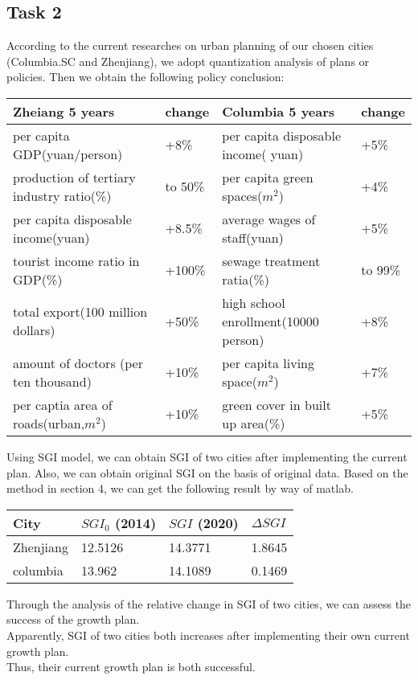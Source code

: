 \documentclass{mcmthesis}
\begin{document}
\subsection{Task 2}%
According to the current researches on urban planning of our chosen cities (Columbia.SC and Zhenjiang), we adopt quantization analysis of plans or policies. Then we obtain the following policy conclusion:\\
\begin{table}[h]

\centering
{}
\begin{tabular}{p{5.2cm}|p{1.2cm}|p{5.2cm}|p{1.2cm}}
\hline
\bf Zheiang 5 years	 & \bf change	 & \bf Columbia 5 years	& \bf change \\
\hline
 per capita GDP(yuan/person)	& +8\%	& per capita disposable income( yuan)	& +5\% \\
production of tertiary industry ratio(\%)	& to 50\%	& per capita green spaces($m^2$)	& +4\% \\
per capita disposable income(yuan)	& +8.5\%	& average wages of staff(yuan)	& +5\% \\
tourist income ratio in GDP(\%)	& +100\%	& sewage treatment ratia(\%)	& to 99\% \\
total export(100 million dollars)	& +50\%	& high school enrollment(10000 person)	& +8\% \\
amount of doctors (per ten thousand)	& +10\%	& per capita living space($m^2$)	& +7\% \\
per captia area of roads(urban,$m^2$)	& +10\%	& green cover in built up area(\%)	& +5\% \\
\hline
\end{tabular}
\end{table}

\noindent Using SGI model, we can obtain SGI of two cities after implementing the current plan. Also, we can obtain original SGI on the basis of original data. Based on the method in section 4, we can get the following result by way of matlab.\\

\begin{table}[h]
\setlength{\abovecaptionskip}{0pt}
\setlength{\belowcaptionskip}{0pt}
\begin{tabular}{p{3.3cm}|p{3cm}|p{3cm}|p{3.3cm}}
\hline
City	& $SGI_0$ (2014)	& $SGI$ (2020)	& $\Delta SGI$ \\
\hline
Zhenjiang	& 12.5126	& 14.3771	& 1.8645 \\
columbia	& 13.962	& 14.1089	& 0.1469 \\
\hline
\end{tabular}
\end{table}
\noindent Through the analysis of the relative change in SGI of two cities, we can assess the success of the growth plan.\\
Apparently, SGI of two cities both increases after implementing their own current growth plan. \\
Thus, their current growth plan is both successful.\\
\end{document}
